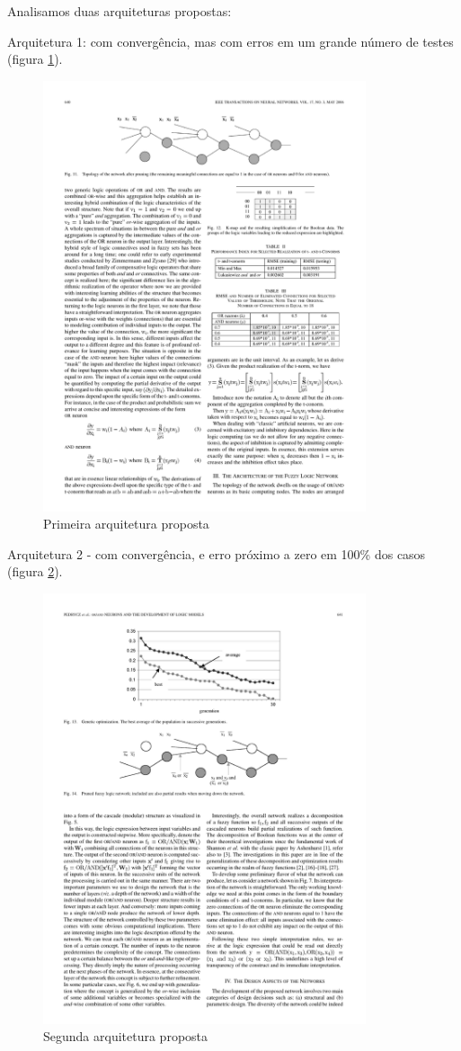 \documentclass{IEEEtran}
\begin{document}
Analisamos duas arquiteturas propostas:

Arquitetura 1: com convergência,  mas com erros em um grande número de testes (figura \ref{arq1}).
\begin{figure}
	\centering
	\includegraphics[width=95mm]{arq1.pdf}
	\caption{Primeira arquitetura proposta}
	\label{arq1}
\end{figure}

Arquitetura 2  - com convergência, e erro próximo a zero em 100\% dos casos (figura \ref{arq2}). 
\begin{figure}
	\centering
	\includegraphics[width=95mm]{arq2.pdf}
	\caption{Segunda arquitetura proposta}
	\label{arq2}
\end{figure}
\end{document}
